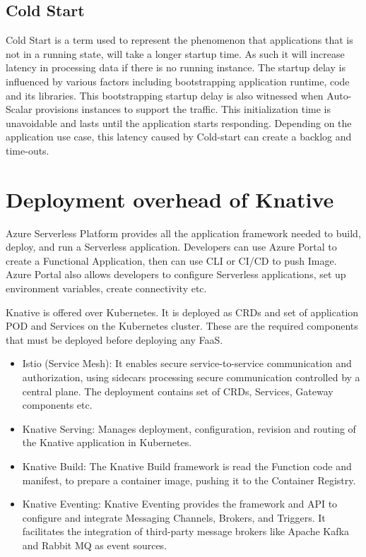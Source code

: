 \documentclass[12pt]{article}
\begin{document}
\begin{flushleft}
\subsection{Cold Start}
Cold Start is a term used to represent the phenomenon that applications that is not in a running state, will take a longer startup time. As such it will increase latency in processing data if there is no running instance. The startup delay is influenced by various factors including bootstrapping application runtime, code and its libraries. This bootstrapping startup delay is also witnessed when Auto-Scalar provisions instances to support the traffic. This initialization time is unavoidable and lasts until the application starts responding. Depending on the application use case, this latency caused by Cold-start can create a backlog and time-outs.

\section{Deployment overhead of Knative}
Azure Serverless Platform provides all the application framework needed to build, deploy, and run a Serverless application. Developers can use Azure Portal to create a Functional Application, then can use CLI or CI/CD to push Image. Azure Portal also allows developers to configure Serverless applications, set up environment variables, create connectivity etc. 

Knative is offered over Kubernetes. It is deployed as CRDs and set of application POD and Services on the Kubernetes cluster. These are the required components that must be deployed before deploying any FaaS.
\begin{itemize}
    \item Istio (Service Mesh): It enables secure service-to-service communication and authorization, using sidecars processing secure communication controlled by a central plane. 
The deployment contains set of CRDs, Services, Gateway components etc.
    \item Knative Serving:  Manages deployment, configuration, revision and routing of the Knative application in Kubernetes.
    \item Knative Build: The Knative Build framework is read the Function code and manifest, to prepare a container image, pushing it to the Container Registry.
    \item Knative Eventing: Knative Eventing provides the framework and API to configure and integrate Messaging Channels, Brokers, and Triggers. It facilitates the integration of third-party message brokers like Apache Kafka and Rabbit MQ as event sources.
\end{itemize}


\end{flushleft}
\end{document}
